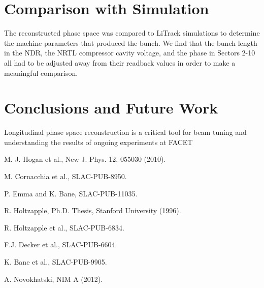 \documentclass[%
twocolumn,
showpacs,preprintnumbers,
 aps,
prstab,
]{revtex4-1}
\begin{document}
\section{Comparison with Simulation}
The reconstructed phase space was compared to LiTrack simulations to determine the machine parameters that produced the bunch. We find that the bunch length in the NDR, the NRTL compressor cavity voltage, and the phase in Sectors 2-10 all had to be adjusted away from their readback values in order to make a meaningful comparison.


\section{Conclusions and Future Work} \label{sec:con}
Longitudinal phase space reconstruction is a critical tool for beam tuning and understanding the results of ongoing experiments at FACET





\begin{thebibliography}{99}

 M. J. Hogan et al., New J. Phys. 12, 055030 (2010).

 M. Cornacchia et al., SLAC-PUB-8950.

 P. Emma and K. Bane, SLAC-PUB-11035.

 R. Holtzapple, Ph.D. Thesis, Stanford University (1996).

 R. Holtzapple et al., SLAC-PUB-6834.

 F.J. Decker et al., SLAC-PUB-6604.

 K. Bane et al., SLAC-PUB-9905.

 A. Novokhatski, NIM A (2012).

\end{thebibliography}
\end{document}
